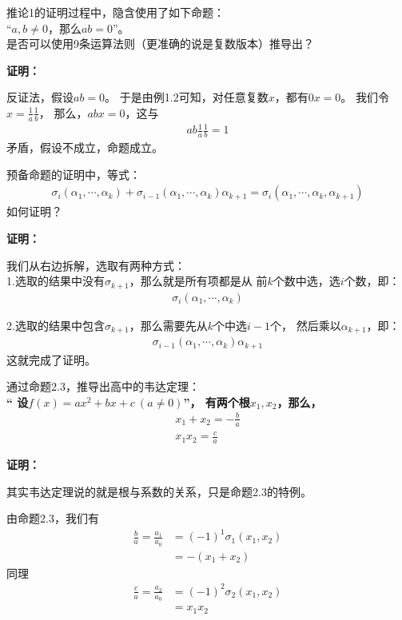 \documentclass{article}
\begin{document}
\begin{zremark}
      推论1的证明过程中，隐含使用了如下命题：\\
      “$a, b \neq 0$，那么$ab = 0$”。\\
      是否可以使用9条运算法则（更准确的说是复数版本）推导出？
\end{zremark}

\textbf{证明：}

反证法，假设$ab = 0$。
于是由例1.2可知，对任意复数$x$，都有$0 x = 0$。
我们令$x = \frac{1}{a} \frac{1}{b}$，
那么，$ab x = 0$，这与
\begin{align*}
      ab \frac{1}{a} \frac{1}{b} = 1
\end{align*}
矛盾，假设不成立，命题成立。

\begin{zremark}
      预备命题的证明中，等式：
      \begin{align*}
            \sigma_i(\alpha_1,\cdots,\alpha_k)
            +
            \sigma_{i - 1}(\alpha_1, \cdots, \alpha_k)\alpha_{k + 1}
            =
            \sigma_i(\alpha_1, \cdots, \alpha_k, \alpha_{k + 1})
      \end{align*}
      如何证明？
\end{zremark}

\textbf{证明：}

我们从右边拆解，选取有两种方式：\\
1.选取的结果中没有$\sigma_{k + 1}$，那么就是所有项都是从
前$k$个数中选，选$i$个数，即：
\begin{align*}
      \sigma_{i}(\alpha_1,\cdots,\alpha_k)
\end{align*}

2.选取的结果中包含$\sigma_{k + 1}$，那么需要先从$k$个中选$i - 1$个，
然后乘以$\alpha_{k + 1}$，即：
\begin{align*}
      \sigma_{i - 1}(\alpha_1, \cdots, \alpha_k)\alpha_{k + 1}
\end{align*}
这就完成了证明。

\begin{zremark}
      通过命题2.3，推导出高中的韦达定理：\\
      \textbf{“
            设$f(x) = ax^2 + bx + c \ (a \neq 0)$”，
            有两个根$x_1, x_2$，那么，
            \begin{align*}
                  x_1 + x_2 = - \frac{b}{a} \\
                  x_1 x_2 = \frac{c}{a}
            \end{align*}
      }
\end{zremark}

\textbf{证明：}

其实韦达定理说的就是根与系数的关系，只是命题2.3的特例。

由命题2.3，我们有
\begin{align*}
      \frac{b}{a} = \frac{a_1}{a_0} & = (-1)^1 \sigma_1(x_1, x_2) \\
                                    & = - (x_1 + x_2)
\end{align*}
同理
\begin{align*}
      \frac{c}{a} = \frac{a_2}{a_0} & = (-1)^2 \sigma_2(x_1, x_2) \\
                                    & = x_1x_2
\end{align*}
\end{document}
